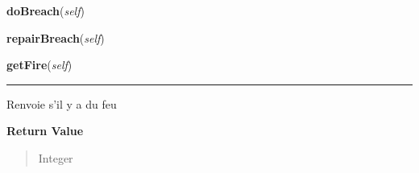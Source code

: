     \label{room:Room:doBreach}

    \vspace{0.5ex}

\hspace{.8\funcindent}\begin{boxedminipage}{\funcwidth}

    \raggedright \textbf{doBreach}(\textit{self})

\setlength{\parskip}{2ex}
\setlength{\parskip}{1ex}
    \end{boxedminipage}

    \label{room:Room:repairBreach}

    \vspace{0.5ex}

\hspace{.8\funcindent}\begin{boxedminipage}{\funcwidth}

    \raggedright \textbf{repairBreach}(\textit{self})

\setlength{\parskip}{2ex}
\setlength{\parskip}{1ex}
    \end{boxedminipage}

    \label{room:Room:getFire}

    \vspace{0.5ex}

\hspace{.8\funcindent}\begin{boxedminipage}{\funcwidth}

    \raggedright \textbf{getFire}(\textit{self})

    \vspace{-1.5ex}

    \rule{\textwidth}{0.5\fboxrule}
\setlength{\parskip}{2ex}
    Renvoie s'il y a du feu

\setlength{\parskip}{1ex}
      \textbf{Return Value}
    \vspace{-1ex}

      \begin{quote}
      Integer

      \end{quote}

    \end{boxedminipage}

